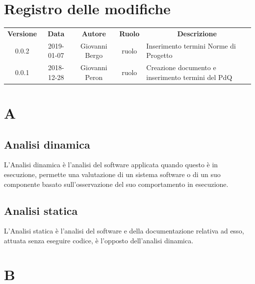 \documentclass[11pt,a4paper]{article}
\begin{document}
	
	\newpage
	\section*{\centering Registro delle modifiche}
	\begin{tabularx}{\textwidth}{ c | c | c | c | X }
		\rowcolor{LightBlue}
		\color{white}\bfseries Versione & \color{white}\bfseries Data & \color{white}\bfseries Autore & \color{white}\bfseries Ruolo & \multicolumn{1}{c}{\color{white}\bfseries Descrizione}\\[0.25cm]
		0.0.2 & 2019-01-07 & Giovanni Bergo & ruolo & Inserimento termini Norme di Progetto \\ 
		\hline 
		0.0.1 & 2018-12-28 & Giovanni Peron & ruolo & Creazione documento e \newline inserimento termini del PdQ \\ 
		\hline
	
	\end{tabularx}
	\newpage
	\setcounter{secnumdepth}{0}
	\tableofcontents
	\newpage
	\section{A}
	\subsection{Analisi dinamica}
		L'Analisi dinamica è l'analisi del software applicata quando questo è in esecuzione, permette una valutazione di un sistema software o di un suo componente basato sull’osservazione del suo comportamento in esecuzione.
	
	\subsection{Analisi statica}
L'Analisi statica è l'analisi del software e della documentazione relativa ad esso, attuata senza eseguire codice, è l'opposto dell'analisi dinamica.
	\section{B}
\end{document}
